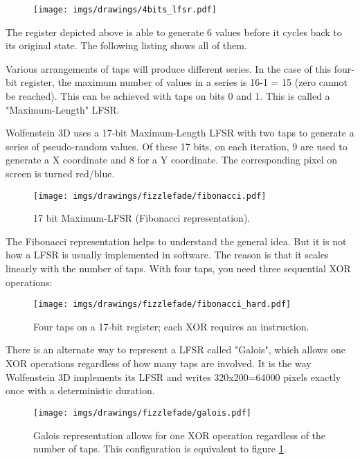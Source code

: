 \begin{figure}[H]
 \centering
  \texttt{[image: imgs/drawings/4bits\_lfsr.pdf]}
\end{figure}
The register depicted above is able to generate 6 values before it cycles back to its original state. The following listing shows all of them.\\
\par
\begin{minipage}{\textwidth}

\end{minipage}
\par
Various arrangements of taps will produce different series. In the case of this four-bit register, the maximum number of values in a series is 16-1 = 15 (zero cannot be reached). This can be achieved with taps on bits 0 and 1. This is called a "Maximum-Length" LFSR.\\
\par
\begin{minipage}{\textwidth}

\end{minipage}
\par
\par
Wolfenstein 3D  uses a 17-bit Maximum-Length LFSR with two taps to generate a series of pseudo-random values. Of these 17 bits, on each iteration, 9 are used to generate a X coordinate and 8 for a Y coordinate. The corresponding pixel on screen is turned red/blue.\\
\par
\begin{figure}[H] 
   \centering \texttt{[image: imgs/drawings/fizzlefade/fibonacci.pdf]} 
   \caption{17 bit Maximum-LFSR (Fibonacci representation).}
   \label{wolf_lfsr_fibo}
\end{figure}
\par
The Fibonacci representation helps to understand the general idea. But it is not how a LFSR is usually implemented in software. The reason is that it scales linearly with the number of taps. With four taps, you need three sequential XOR operations:
\par
\begin{figure}[H] 
    \centering \texttt{[image: imgs/drawings/fizzlefade/fibonacci\_hard.pdf]} 
    \caption{Four taps on a 17-bit register; each XOR requires an instruction.}
\end{figure}
\par
There is an alternate way to represent a LFSR called "Galois", which allows one XOR operations regardless of how many taps are involved. It is the way Wolfenstein 3D implements its LFSR and writes 320x200=64000 pixels exactly once with a deterministic duration.
\par
\begin{figure}[H] 
    \centering \texttt{[image: imgs/drawings/fizzlefade/galois.pdf]} 
    \caption{Galois representation allows for one XOR operation regardless of the number of taps. This configuration is equivalent to figure \ref{wolf_lfsr_fibo}.}
\end{figure}
      
